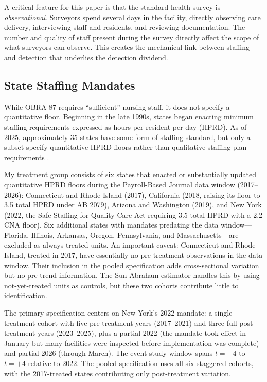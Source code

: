 \documentclass[12pt]{article}
\begin{document}
A critical feature for this paper is that the standard health survey is \textit{observational}. Surveyors spend several days in the facility, directly observing care delivery, interviewing staff and residents, and reviewing documentation. The number and quality of staff present during the survey directly affect the scope of what surveyors can observe. This creates the mechanical link between staffing and detection that underlies the detection dividend.

\subsection{State Staffing Mandates}

While OBRA-87 requires ``sufficient'' nursing staff, it does not specify a quantitative floor. Beginning in the late 1990s, states began enacting minimum staffing requirements expressed as hours per resident per day (HPRD). As of 2025, approximately 35 states have some form of staffing standard, but only a subset specify quantitative HPRD floors rather than qualitative staffing-plan requirements \citep{harrington2020}.

My treatment group consists of six states that enacted or substantially updated quantitative HPRD floors during the Payroll-Based Journal data window (2017--2026): Connecticut and Rhode Island (2017), California (2018, raising its floor to 3.5 total HPRD under AB 2079), Arizona and Washington (2019), and New York (2022, the Safe Staffing for Quality Care Act requiring 3.5 total HPRD with a 2.2 CNA floor). Six additional states with mandates predating the data window---Florida, Illinois, Arkansas, Oregon, Pennsylvania, and Massachusetts---are excluded as always-treated units. An important caveat: Connecticut and Rhode Island, treated in 2017, have essentially no pre-treatment observations in the data window. Their inclusion in the pooled specification adds cross-sectional variation but no pre-trend information. The Sun-Abraham estimator handles this by using not-yet-treated units as controls, but these two cohorts contribute little to identification.

The primary specification centers on New York's 2022 mandate: a single treatment cohort with five pre-treatment years (2017--2021) and three full post-treatment years (2023--2025), plus a partial 2022 (the mandate took effect in January but many facilities were inspected before implementation was complete) and partial 2026 (through March). The event study window spans $t = -4$ to $t = +4$ relative to 2022. The pooled specification uses all six staggered cohorts, with the 2017-treated states contributing only post-treatment variation.
\end{document}
